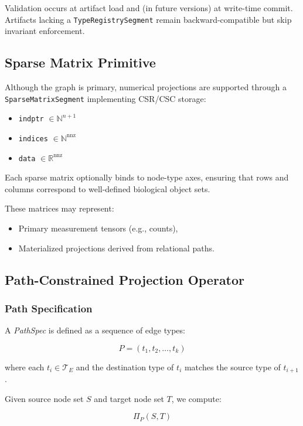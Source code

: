 \documentclass[11pt]{article}
\begin{document}
Validation occurs at artifact load and (in future versions) at write-time commit. Artifacts lacking a \texttt{TypeRegistrySegment} remain backward-compatible but skip invariant enforcement.

\subsection{Sparse Matrix Primitive}

Although the graph is primary, numerical projections are supported through a \texttt{SparseMatrixSegment} implementing CSR/CSC storage:

\begin{itemize}
    \item \texttt{indptr} $\in \mathbb{N}^{n+1}$
    \item \texttt{indices} $\in \mathbb{N}^{\text{nnz}}$
    \item \texttt{data} $\in \mathbb{R}^{\text{nnz}}$
\end{itemize}

Each sparse matrix optionally binds to node-type axes, ensuring that rows and columns correspond to well-defined biological object sets.

These matrices may represent:
\begin{itemize}
    \item Primary measurement tensors (e.g., counts),
    \item Materialized projections derived from relational paths.
\end{itemize}

\subsection{Path-Constrained Projection Operator}

\subsubsection{Path Specification}

A \emph{PathSpec} is defined as a sequence of edge types:

\[
P = (t_1, t_2, \dots, t_k)
\]

where each $t_i \in \mathcal{T}_E$ and the destination type of $t_i$ matches the source type of $t_{i+1}$.

Given source node set $S$ and target node set $T$, we compute:

\[
\Pi_P(S,T)
\]
\end{document}
